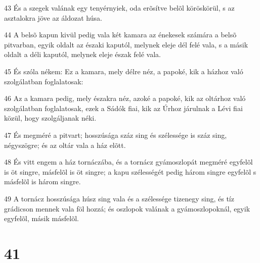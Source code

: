 \par 43 És a szegek valának egy tenyérnyiek, oda erõsítve belõl köröskörül, s az asztalokra jöve az áldozat húsa.
\par 44 A belsõ kapun kivül pedig vala két kamara az énekesek számára a belsõ pitvarban, egyik oldalt az északi kaputól, melynek eleje dél felé vala, s a másik oldalt a déli kaputól, melynek eleje észak felé vala.
\par 45 És szóla nékem: Ez a kamara, mely délre néz, a papoké, kik a házhoz való szolgálatban foglalatosak:
\par 46 Az a kamara pedig, mely északra néz, azoké a papoké, kik az oltárhoz való szolgálatban foglalatosak, ezek a Sádók fiai, kik az Úrhoz járulnak a Lévi fiai közül, hogy szolgáljanak néki.
\par 47 És megméré a pitvart; hosszúsága száz sing és szélessége is száz sing, négyszögre; és az oltár vala a ház elõtt.
\par 48 És vitt engem a ház tornáczába, és a tornácz gyámoszlopát megméré egyfelõl is öt singre, másfelõl is öt singre; a kapu szélességét pedig három singre egyfelõl s másfelõl is három singre.
\par 49 A tornácz hosszúsága húsz sing vala és a szélessége tizenegy sing, és tíz grádicson mennek vala föl hozzá; és oszlopok valának a gyámoszlopoknál, egyik egyfelõl, másik másfelõl.

\chapter{41}

